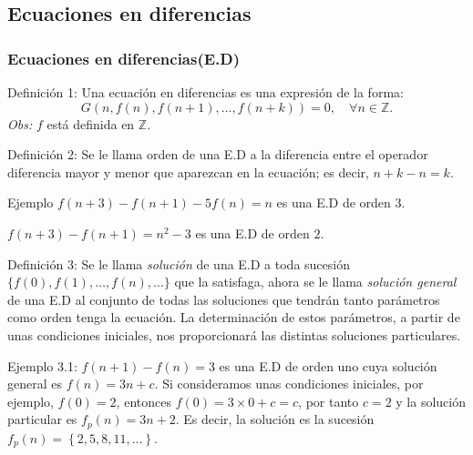 \subsection{Ecuaciones en diferencias}

\begin{frame}
\frametitle{Ecuaciones en diferencias(E.D)}
\begin{block}{Definición 1:}
Una ecuación en diferencias es una expresión de la forma: \[ G\left(n,f(n),f\left(n+1\right),\ldots,f\left(n+k\right)\right)=0,\quad\forall n\in\mathds{Z}. \]
\emph{Obs:} $f$ está definida en $\mathds{Z}$.
\end{block}

\begin{block}{Definición 2:}
Se le llama orden de una E.D a la diferencia entre el operador diferencia mayor y menor que aparezcan en la ecuación; es decir, $n+k-n=k$.
\end{block}

\begin{block}{Ejemplo}
$f\left(n+3\right)-f\left(n+1\right)-5f(n)=n$ es una E.D de orden $3$.

$f\left(n+3\right)-f\left(n+1\right)=n^{2}-3$ es una E.D de orden $2$.
\end{block}
\end{frame}

\begin{frame}
\begin{block}{Definición 3:}
Se le llama \emph{solución} de una E.D a toda sucesión $\{f\left(0\right),f\left(1\right),\ldots,f(n),\ldots\}$ que la satisfaga, ahora se le llama \emph{solución general} de una E.D al conjunto de todas las soluciones que tendrán tanto parámetros como orden tenga la ecuación. La determinación de estos parámetros, a partir de unas condiciones iniciales, nos proporcionará las distintas soluciones particulares.
\end{block}

\begin{block}{Ejemplo 3.1:}
$f\left(n+1\right)-f\left(n\right)=3$ es una E.D de orden uno cuya solución general es $f\left(n\right)=3n+c$. Si consideramos unas condiciones iniciales, por ejemplo, $f(0)=2$, entonces $f(0)=3\times0+c=c$, por tanto $c=2$ y la solución particular es $f_{p}(n)=3n+2$. Es decir, la solución es la sucesión $f_{p}(n)=\left\{2,5,8,11,\ldots\right\}$.
\end{block}
\end{frame}

